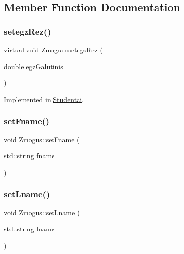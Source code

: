 \subsection{Member Function Documentation}
\mbox{\label{class_zmogus_a19656beb88d5e73a65ceef8c68e191c4}} 
\subsubsection{\texorpdfstring{setegzRez()}{setegzRez()}}
{\footnotesize\ttfamily virtual void Zmogus\+::setegz\+Rez (\begin{DoxyParamCaption}\item[{double}]{egz\+Galutinis }\end{DoxyParamCaption})\hspace{0.3cm}{\ttfamily [pure virtual]}}



Implemented in \mbox{\hyperlink{class_studentai_ad4979b0c6137e0ce9edad1d609bed522}{Studentai}}.

\mbox{\label{class_zmogus_a77d6cca8a626da110584613d1f260b5e}} 
\subsubsection{\texorpdfstring{setFname()}{setFname()}}
{\footnotesize\ttfamily void Zmogus\+::set\+Fname (\begin{DoxyParamCaption}\item[{std\+::string}]{fname\+\_\+ }\end{DoxyParamCaption})\hspace{0.3cm}{\ttfamily [inline]}}

\mbox{\label{class_zmogus_af6a47ecc1e25e1b3e78370ad868d52c8}} 
\subsubsection{\texorpdfstring{setLname()}{setLname()}}
{\footnotesize\ttfamily void Zmogus\+::set\+Lname (\begin{DoxyParamCaption}\item[{std\+::string}]{lname\+\_\+ }\end{DoxyParamCaption})\hspace{0.3cm}{\ttfamily [inline]}}



